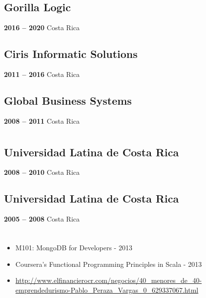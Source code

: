 \documentclass[a4paper,10pt]{article}
\begin{document}
\subsection*{Gorilla Logic}
\textbf{2016 -- 2020} \hfill  Costa Rica \\
\emph{\gorillaTitle}
\gorillaText

\subsection*{Ciris Informatic Solutions}
\textbf{2011 -- 2016} \hfill  Costa Rica \\
\emph{\cirisTitle}
\cirisText

\subsection*{Global Business Systems}
\textbf{2008 -- 2011} \hfill  Costa Rica \\
\emph{\gbsysTitle}
\gbsysText

\section*{\educacion}
\subsection*{Universidad Latina de Costa Rica}
\textbf{2008 -- 2010} \hfill  Costa Rica \\
\emph{\licenciaturaTitle}
\licenciaturaText

\subsection*{Universidad Latina de Costa Rica}
\textbf{2005 -- 2008} \hfill  Costa Rica \\
\emph{\bachilleratorTitle}
\bachilleratorText

\section*{\desarrolloProfesional}
\begin{itemize}
    \item M101: MongoDB for Developers - 2013
    \item Coursera’s Functional Programming Principles in Scala - 2013
    \item \elfinanciero
    \url{http://www.elfinancierocr.com/negocios/40_menores_de_40-emprendedurismo-Pablo_Peraza_Vargas_0_629337067.html}
\end{itemize}
\end{document}
